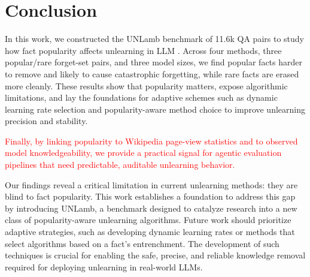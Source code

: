 \documentclass[sigconf,anonymous]{aamas}
\begin{document}




\section{Conclusion}
In this work, we constructed the UNLamb benchmark of 11.6k QA pairs to study how fact popularity affects unlearning in LLM . Across four methods, three popular/rare forget-set pairs, and three model sizes, we find popular facts harder to remove and likely to cause catastrophic forgetting, while rare facts are erased more cleanly. These results show that popularity matters, expose algorithmic limitations, and lay the foundations for adaptive schemes such as dynamic learning rate selection and popularity-aware method choice to improve unlearning precision and stability.

\textcolor{red}{
Finally, by linking popularity to Wikipedia page-view statistics and to observed model knowledgeability, we provide a practical signal for agentic evaluation pipelines that need predictable, auditable unlearning behavior.
}

Our findings reveal a critical limitation in current unlearning methods: they are blind to fact popularity. This work establishes a foundation to address this gap by introducing UNLamb, a benchmark designed to catalyze research into a new class of popularity-aware unlearning algorithms. Future work should prioritize adaptive strategies, such as developing dynamic learning rates or methods that select algorithms based on a fact's entrenchment. The development of such techniques is crucial for enabling the safe, precise, and reliable knowledge removal required for deploying unlearning in real-world LLMs.
\end{document}
